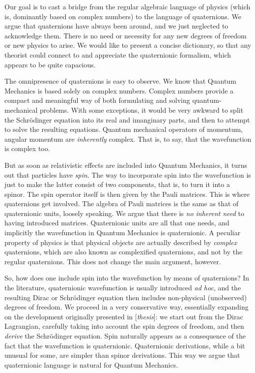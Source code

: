\documentclass[epsfig,12pt]{article}
\begin{document}
	Our goal is to cast a bridge from the regular algebraic language of physics (which is, dominantly based
	on complex numbers) to the language of quaternions.
	We argue that quaternions have always been around, and we just neglected to acknowledge them.
	There is no need or necessity for any new degrees of freedom or new physics to arise.
	We would like to present a concise dictionary, so that any theorist could connect to and appreciate
	the quaternionic formalism, which appears to be quite capacious.

	The omnipresence of quaternions is easy to observe.
	We know that Quantum Mechanics is based solely on complex numbers.
	Complex numbers provide a compact and meaningful way of both formulating and solving quantum-mechanical problems.
	With some exceptions, it would be very awkward to split the Schr\"odinger equation into its real and imanginary parts,
	and then to attempt to solve the resulting equations.
	Quantum mechanical operators of momentum, angular momentum are \emph{inherently} complex.
	That is, to say, that the wavefunction is complex too.
	
	But as soon as relativistic effects are included into Quantum Mechanics, it turns out that particles
	have \emph{spin}.
	The way to incorporate spin into the wavefunction is just to make the latter consist of two components, that is,
	to turn it into a spinor.
	The spin operator itself is then given by the Pauli matrices.
	This is where quaternions get involved.
	The algebra of Pauli matrices is the same as that of quaternionic units, loosely speaking.
	We argue that there is \emph{no inherent need} to having introduced matrices.
	Quaternionic units are all that one needs, and implicitly the wavefunction in Quantum Mechanics is quaternionic.
	A peculiar property of physics is that physical objects are actually described by \emph{complex} quaternions,
	which are also known as complexified quaternions, and not by the regular quaternions.
	This does not change the main argument, however.

	So, how does one include spin into the wavefunction by means of quaternions?
	In the literature, quaternionic wavefunction is usually introduced \emph{ad hoc},
	and the resulting Dirac or Schr\"odinger equation then includes non-physical (unobserved) degrees of freedom.
	We proceed in a very conservative way, essentially expanding on the development originally presented in [{\it thesis}]:
	we start out from the Dirac Lagrangian, carefully taking into account the spin degrees of freedom,
	and then \emph{derive} the Schr\"odinger equation.
	Spin naturally appears as a consequence of the fact that the wavefunction is quaternionic.
	Quaternionic derivations, while a bit unusual for some, are simpler than spinor derivations.
	This way we argue that quaternionic language is natural for Quantum Mechanics.
\end{document}
